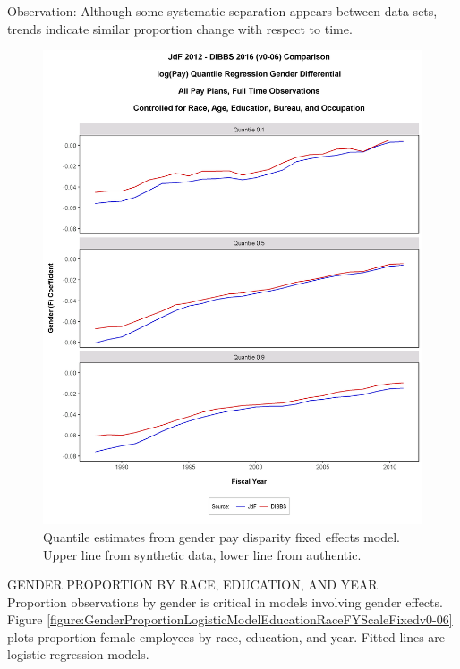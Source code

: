 \documentclass[10pt, letterpaper]{article}
\begin{document}
\begin{spacing}{1.0}
Observation:  Although some systematic separation appears between data sets, trends indicate similar proportion change with respect to time.

\vspace{20pt}

\begin{figure}[h!]
    \centering
    \includegraphics[width=6in, trim={0 0 0 1.5in}, clip]{GenderPayDifferentialQuantileRegressionAgeRaceEdPanelv0-06.png}
    \caption{Quantile estimates from gender pay disparity fixed effects model.  Upper line from synthetic data, lower line from authentic.}
    \label{figure:GenderPayDifferentialQuantileRegressionAgeRaceEdPanelv0-06}
\end{figure}

\clearpage

GENDER PROPORTION BY RACE, EDUCATION, AND YEAR\\

Proportion observations by gender is critical in models involving gender effects.  Figure \ref{figure:GenderProportionLogisticModelEducationRaceFYScaleFixedv0-06} plots proportion female employees by race, education, and year.  Fitted lines are logistic regression models.\\


\end{spacing}
\end{document}

